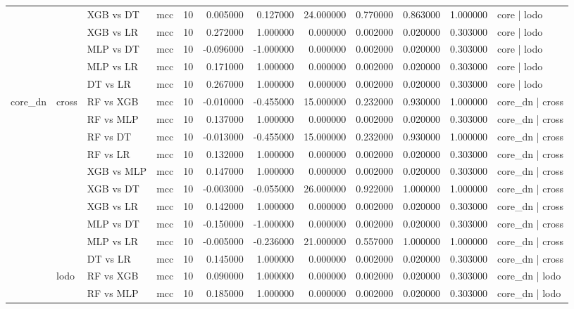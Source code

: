\begin{tabular}{llllrrrrrrrl}
 &  & XGB vs DT & mcc & 10 & 0.005000 & 0.127000 & 24.000000 & 0.770000 & 0.863000 & 1.000000 & core | lodo \\
 &  & XGB vs LR & mcc & 10 & 0.272000 & 1.000000 & 0.000000 & 0.002000 & 0.020000 & 0.303000 & core | lodo \\
 &  & MLP vs DT & mcc & 10 & -0.096000 & -1.000000 & 0.000000 & 0.002000 & 0.020000 & 0.303000 & core | lodo \\
 &  & MLP vs LR & mcc & 10 & 0.171000 & 1.000000 & 0.000000 & 0.002000 & 0.020000 & 0.303000 & core | lodo \\
 &  & DT vs LR & mcc & 10 & 0.267000 & 1.000000 & 0.000000 & 0.002000 & 0.020000 & 0.303000 & core | lodo \\
\cline{1-12} \cline{2-12}
\multirow[t]{20}{*}{core_dn} & \multirow[t]{10}{*}{cross} & RF vs XGB & mcc & 10 & -0.010000 & -0.455000 & 15.000000 & 0.232000 & 0.930000 & 1.000000 & core_dn | cross \\
 &  & RF vs MLP & mcc & 10 & 0.137000 & 1.000000 & 0.000000 & 0.002000 & 0.020000 & 0.303000 & core_dn | cross \\
 &  & RF vs DT & mcc & 10 & -0.013000 & -0.455000 & 15.000000 & 0.232000 & 0.930000 & 1.000000 & core_dn | cross \\
 &  & RF vs LR & mcc & 10 & 0.132000 & 1.000000 & 0.000000 & 0.002000 & 0.020000 & 0.303000 & core_dn | cross \\
 &  & XGB vs MLP & mcc & 10 & 0.147000 & 1.000000 & 0.000000 & 0.002000 & 0.020000 & 0.303000 & core_dn | cross \\
 &  & XGB vs DT & mcc & 10 & -0.003000 & -0.055000 & 26.000000 & 0.922000 & 1.000000 & 1.000000 & core_dn | cross \\
 &  & XGB vs LR & mcc & 10 & 0.142000 & 1.000000 & 0.000000 & 0.002000 & 0.020000 & 0.303000 & core_dn | cross \\
 &  & MLP vs DT & mcc & 10 & -0.150000 & -1.000000 & 0.000000 & 0.002000 & 0.020000 & 0.303000 & core_dn | cross \\
 &  & MLP vs LR & mcc & 10 & -0.005000 & -0.236000 & 21.000000 & 0.557000 & 1.000000 & 1.000000 & core_dn | cross \\
 &  & DT vs LR & mcc & 10 & 0.145000 & 1.000000 & 0.000000 & 0.002000 & 0.020000 & 0.303000 & core_dn | cross \\
\cline{2-12}
 & \multirow[t]{10}{*}{lodo} & RF vs XGB & mcc & 10 & 0.090000 & 1.000000 & 0.000000 & 0.002000 & 0.020000 & 0.303000 & core_dn | lodo \\
 &  & RF vs MLP & mcc & 10 & 0.185000 & 1.000000 & 0.000000 & 0.002000 & 0.020000 & 0.303000 & core_dn | lodo \\

\end{tabular}

